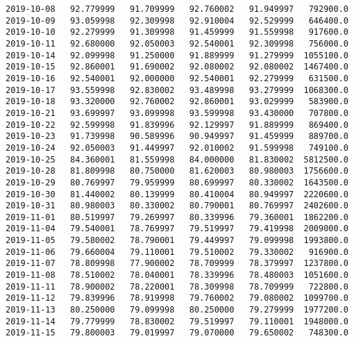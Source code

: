 \documentclass[11pt]{article}
\begin{document}
\begin{Verbatim}[commandchars=\\\{\}]
2019-10-08   92.779999   91.709999   92.760002   91.949997   792900.0   
2019-10-09   93.059998   92.309998   92.910004   92.529999   646400.0   
2019-10-10   92.279999   91.309998   91.459999   91.559998   917600.0   
2019-10-11   92.680000   92.050003   92.540001   92.309998   756000.0   
2019-10-14   92.099998   91.250000   91.889999   91.279999  1055100.0   
2019-10-15   92.860001   91.690002   92.080002   92.080002  1467400.0   
2019-10-16   92.540001   92.000000   92.540001   92.279999   631500.0   
2019-10-17   93.559998   92.830002   93.489998   93.279999  1068300.0   
2019-10-18   93.320000   92.760002   92.860001   93.029999   583900.0   
2019-10-21   93.699997   93.099998   93.599998   93.430000   707800.0   
2019-10-22   92.599998   91.839996   92.129997   91.889999   869400.0   
2019-10-23   91.739998   90.589996   90.949997   91.459999   889700.0   
2019-10-24   92.050003   91.449997   92.010002   91.599998   749100.0   
2019-10-25   84.360001   81.559998   84.000000   81.830002  5812500.0   
2019-10-28   81.809998   80.750000   81.620003   80.980003  1756600.0   
2019-10-29   80.769997   79.959999   80.699997   80.330002  1643500.0   
2019-10-30   81.440002   80.139999   80.410004   80.949997  2220600.0   
2019-10-31   80.980003   80.330002   80.790001   80.769997  2402600.0   
2019-11-01   80.519997   79.269997   80.339996   79.360001  1862200.0   
2019-11-04   79.540001   78.769997   79.519997   79.419998  2009000.0   
2019-11-05   79.580002   78.790001   79.449997   79.099998  1993800.0   
2019-11-06   79.660004   79.110001   79.510002   79.330002   916900.0   
2019-11-07   78.809998   77.900002   78.709999   78.379997  1237800.0   
2019-11-08   78.510002   78.040001   78.339996   78.480003  1051600.0   
2019-11-11   78.900002   78.220001   78.309998   78.709999   722800.0   
2019-11-12   79.839996   78.919998   79.760002   79.080002  1099700.0   
2019-11-13   80.250000   79.099998   80.250000   79.279999  1977200.0   
2019-11-14   79.779999   78.830002   79.519997   79.110001  1948000.0   
2019-11-15   79.800003   79.019997   79.070000   79.650002   748300.0   


\end{Verbatim}
\end{document}
